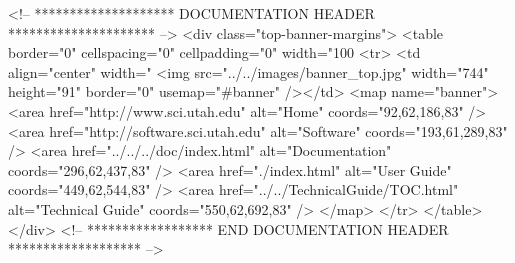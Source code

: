 \documentclass[11pt]{article}
\begin{document}


\begin{rawhtml}
<!-- ******************** DOCUMENTATION HEADER ********************* -->
<div class="top-banner-margins">
<table border="0" cellspacing="0" cellpadding="0" width="100%
<tr>
<td align="center" width="%
<img src="../../images/banner_top.jpg" width="744" height="91" border="0" usemap="#banner" /></td>
<map name="banner">
<area href="http://www.sci.utah.edu" alt="Home" coords="92,62,186,83" />
<area href="http://software.sci.utah.edu" alt="Software" coords="193,61,289,83" />
<area href="../../../doc/index.html" alt="Documentation" coords="296,62,437,83" />
<area href="./index.html" alt="User Guide" coords="449,62,544,83" />
<area href="../../TechnicalGuide/TOC.html" alt="Technical Guide" coords="550,62,692,83" />
</map>
</tr>
</table>
</div>
<!-- ****************** END DOCUMENTATION HEADER ******************* -->
\end{rawhtml}


\newpage
\tableofcontents
\newpage



\newpage




%

%

\newpage
%
\newpage
%

\newpage


\newpage
\printindex
\end{document}
